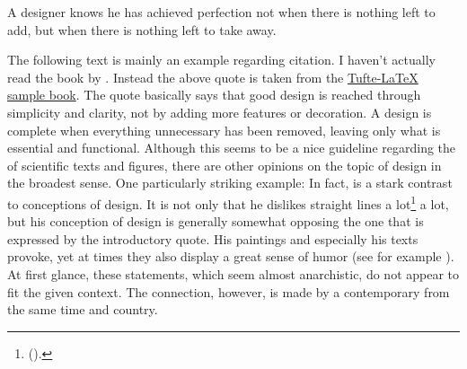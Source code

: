\epigraph{A designer knows he has achieved perfection not when there is nothing left to add, but when there is nothing left to take away.}{}

The following text is mainly an example regarding citation. I haven’t actually read the book  by . Instead the above quote is taken from the \href{https://tug.ctan.org/macros/latex/contrib/tufte-latex/sample-book.pdf}{Tufte-LaTeX sample book}. The quote basically says that good design is reached through simplicity and clarity, not by adding more features or decoration. A design is complete when everything unnecessary has been removed, leaving only what is essential and functional. Although this seems to be a nice guideline regarding the  of scientific texts and figures, there are other opinions on the topic of design in the broadest sense. One particularly striking example:
In fact,  is a stark contrast to  conceptions of design. It is not only that he dislikes straight lines a lot\footnote{\Cf {} (\cite{hundertwasserweb1}).} a lot, but his conception of design is generally somewhat opposing the one that is expressed by the introductory quote. His paintings and especially his texts provoke, yet at times they also display a great sense of humor (see for example \cite{hundertwasserweb3}). At first glance, these statements, which seem almost anarchistic, do not appear to fit the given context. The connection, however, is made by a contemporary from the same time and country.